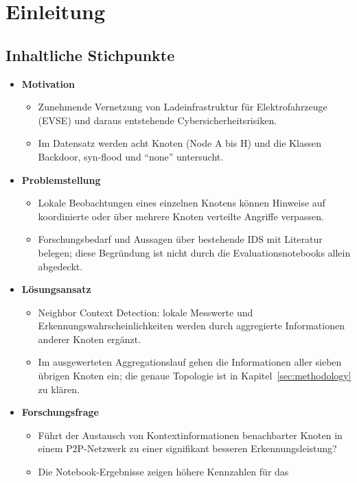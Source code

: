 \section{Einleitung}
\label{sec:introduction}

\subsection{Inhaltliche Stichpunkte}
\begin{itemize}
  \item \textbf{Motivation}
  \begin{itemize}
    \item Zunehmende Vernetzung von Ladeinfrastruktur für Elektrofahrzeuge
          (EVSE) und daraus entstehende Cybersicherheitsrisiken.
    \item Im Datensatz werden acht Knoten (Node A bis H) und die Klassen
          Backdoor, syn-flood und ``none'' untersucht.
  \end{itemize}
  \item \textbf{Problemstellung}
  \begin{itemize}
    \item Lokale Beobachtungen eines einzelnen Knotens können Hinweise auf
          koordinierte oder über mehrere Knoten verteilte Angriffe verpassen.
    \item Forschungsbedarf und Aussagen über bestehende IDS mit Literatur
          belegen; diese Begründung ist nicht durch die Evaluationsnotebooks
          allein abgedeckt.
  \end{itemize}
  \item \textbf{Lösungsansatz}
  \begin{itemize}
    \item Neighbor Context Detection: lokale Messwerte und
          Erkennungswahrscheinlichkeiten werden durch aggregierte
          Informationen anderer Knoten ergänzt.
    \item Im ausgewerteten Aggregationslauf gehen die Informationen aller
          sieben übrigen Knoten ein; die genaue Topologie ist in
          Kapitel~\ref{sec:methodology} zu klären.
  \end{itemize}
  \item \textbf{Forschungsfrage}
  \begin{itemize}
    \item Führt der Austausch von Kontextinformationen benachbarter Knoten
          in einem P2P-Netzwerk zu einer signifikant besseren
          Erkennungsleistung?
    \item Die Notebook-Ergebnisse zeigen höhere Kennzahlen für das

\end{itemize}
\end{itemize}

